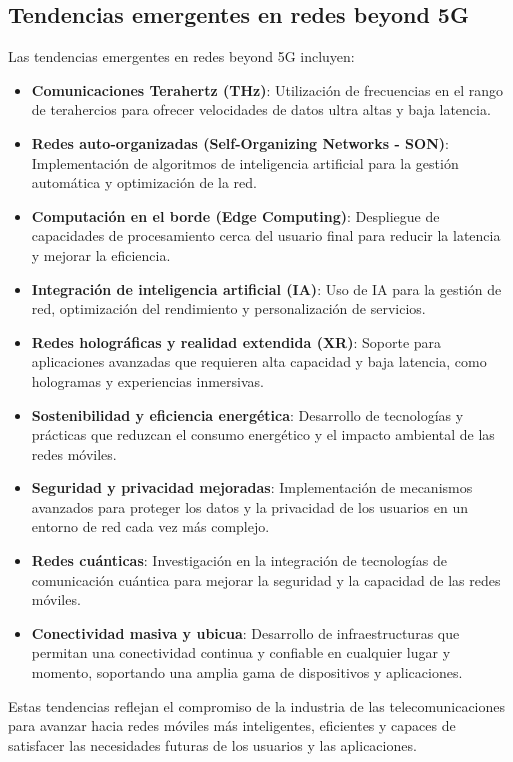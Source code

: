 \subsection{Tendencias emergentes en redes beyond 5G}
Las tendencias emergentes en redes beyond 5G incluyen:
\begin{itemize}
    \item \textbf{Comunicaciones Terahertz (THz)}: Utilización de frecuencias en el rango de terahercios para ofrecer velocidades de datos ultra altas y baja latencia.
    \item \textbf{Redes auto-organizadas (Self-Organizing Networks - SON)}: Implementación de algoritmos de inteligencia artificial para la gestión automática y optimización de la red.
    \item \textbf{Computación en el borde (Edge Computing)}: Despliegue de capacidades de procesamiento cerca del usuario final para reducir la latencia y mejorar la eficiencia.
    \item \textbf{Integración de inteligencia artificial (IA)}: Uso de IA para la gestión de red, optimización del rendimiento y personalización de servicios.
    \item \textbf{Redes holográficas y realidad extendida (XR)}: Soporte para aplicaciones avanzadas que requieren alta capacidad y baja latencia, como hologramas y experiencias inmersivas.
    \item \textbf{Sostenibilidad y eficiencia energética}: Desarrollo de tecnologías y prácticas que reduzcan el consumo energético y el impacto ambiental de las redes móviles.   
    \item \textbf{Seguridad y privacidad mejoradas}: Implementación de mecanismos avanzados para proteger los datos y la privacidad de los usuarios en un entorno de red cada vez más complejo.
    \item   \textbf{Redes cuánticas}: Investigación en la integración de tecnologías de comunicación cuántica para mejorar la seguridad y la capacidad de las redes móviles.    
    \item \textbf{Conectividad masiva y ubicua}: Desarrollo de infraestructuras que permitan una conectividad continua y confiable en cualquier lugar y momento, soportando una amplia gama de dispositivos y aplicaciones.
\end{itemize}
Estas tendencias reflejan el compromiso de la industria de las telecomunicaciones para avanzar hacia redes móviles más inteligentes, eficientes y capaces de satisfacer las necesidades futuras de los usuarios y las aplicaciones.

\clearpage